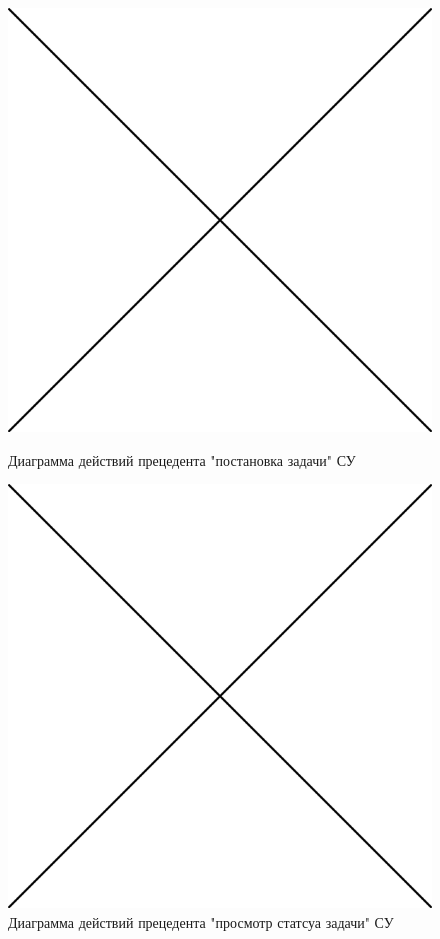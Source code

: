 \documentclass[a4paper,12pt]{report}
\numberwithin{equation}{section}
\begin{document}
\begin{figure}  
  \centering
  \begin{minipage}{.49\linewidth}
    \centering
    \includegraphics[width=\linewidth]{img/placeholder} %
    \caption{Диаграмма действий прецедента "постановка задачи" СУ}
    \label{fig:logic-place}
  \end{minipage}
  \hfill
  \begin{minipage}{.49\linewidth}
    \centering
    \includegraphics[width=\linewidth]{img/placeholder} %
    \caption{Диаграмма действий прецедента "просмотр статсуа задачи" СУ}
    \label{fig:logic-view}
  \end{minipage}  
\end{figure}
\end{document}
